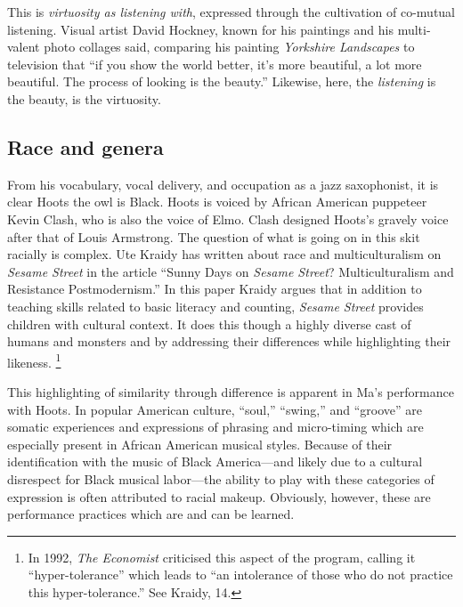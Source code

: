 \documentclass[12pt,letterpaper]{article}
\begin{document}
	This is \textit{virtuosity as listening with}, expressed through the
	cultivation of co-mutual listening.
	Visual artist David Hockney, known for his paintings and his 
	multi-valent photo collages said, comparing his painting 
	\textit{Yorkshire 
	Landscapes} to television that ``if you show the world better, it's more
	beautiful, a lot more beautiful. The process of looking is the 
	beauty.''\autocite[100]{Odell} Likewise, here, the \textit{listening} is
	the beauty, is the virtuosity.  


	\subsection*{Race and genera}

	From his vocabulary, vocal delivery, and occupation as a jazz 
	saxophonist, it is clear Hoots the owl is Black. Hoots is voiced by 
	African American puppeteer Kevin Clash, who is also the voice of Elmo. 
	Clash designed Hoots's gravely voice after that of Louis 
	Armstrong.\autocites()(Also see the biographical documentary of the same
	name.)[41]{Clash} The question of what is going on in this skit racially
	is complex. Ute Kraidy has written about race and multiculturalism on 
	\textit{Sesame Street} in the article ``Sunny Days on 
	\textit{Sesame Street}? Multiculturalism and Resistance Postmodernism.''
	In this paper Kraidy argues that in addition to teaching skills related
	to basic literacy and counting, \textit{Sesame Street} provides children
	with cultural context.\autocite[13]{Kraidy} It does this though a highly
	diverse cast of humans and monsters and by addressing their differences
	while highlighting their likeness\autocite[18]{Kraidy}. \footnote{In 
	1992, \textit{The Economist} criticised this aspect of the program, 
	calling it ``hyper-tolerance'' which leads to ``an intolerance of those
	who do not practice this hyper-tolerance.'' See Kraidy, 14.}	

	This highlighting of similarity through difference is apparent in Ma's 
	performance with Hoots. In popular American culture, ``soul,'' 
	``swing,'' and ``groove'' are somatic experiences and expressions of 
	phrasing and micro-timing which are especially present in African 
	American musical styles. Because of their identification with the music
	of Black America---and likely due to a cultural disrespect for Black 
	musical labor---the ability to play with these categories of expression
	is often attributed to racial makeup. Obviously, however, these are 
	performance practices which are and can be learned.   
\end{document}
